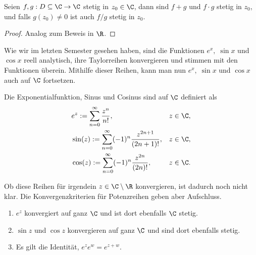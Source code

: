 \begin{prop}
\label{prop:2.6}
Seien $f,g : D\subseteq \C\to\C$ stetig in $z_0\in\C$, dann sind $f+g$ und
$f\cdot g$ stetig in $z_0$, und falls $g(z_0)\neq 0$ ist auch $f/g$ stetig
in $z_0$.\fishhere
\end{prop}
\begin{proof}
Analog zum Beweis in $\R$.\qedhere
\end{proof}

Wie wir im letzten Semester gesehen haben, sind die Funktionen $e^x,\;\sin x$
und $\cos x$ reell analytisch, ihre Taylorreihen konvergieren und stimmen
mit den Funktionen überein. Mithilfe dieser Reihen, kann man nun $e^x,\;\sin x$
und $\cos x$ auch auf $\C$ fortsetzen.

\begin{defn}
\label{defn:2.7}
Die Exponentialfunktion, Sinus und Cosinus sind auf $\C$ definiert als
  \begin{align*}
  &e^z := \sum\limits_{n=0}^\infty \frac{z^n}{n!}, &&z\in\C,\\
  &\sin(z) := \sum\limits_{n=0}^\infty (-1)^n\frac{z^{2n+1}}{(2n+1)!}, && z\in
  \C,\\
  &\cos(z) := \sum\limits_{n=0}^\infty (-1)^n\frac{z^{2n}}{(2n)!}, && z\in
  \C.
  \end{align*}
\end{defn}

Ob diese Reihen für irgendein $z\in\C\setminus\R$ konvergieren, ist dadurch noch
nicht klar. Die Konvergenzkriterien für Potenzreihen geben aber Aufschluss.

\begin{cor}
\label{prop:2.8}
\begin{enumerate}
\item 
$e^z$ konvergiert auf ganz $\C$ und ist dort ebenfalls $\C$ stetig.
\item
$\sin z$ und $\cos z$ konvergieren auf ganz $\C$ und sind dort ebenfalls 
stetig.
\item Es gilt die Identität,
$e^ze^w = e^{z+w}$.\fishhere
\end{enumerate}
\end{cor}

